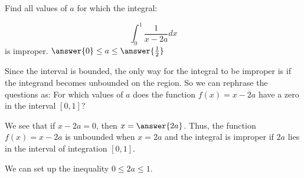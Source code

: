 \documentclass{ximera}
\author{Jim Talamo}
\begin{document}
\begin{exercise}
Find all values of $a$ for which the integral:

\[
\int_{0}^{1} \frac{1}{x-2a} dx
\]
 is improper.   $\answer{0} \leq a \leq \answer{\frac{1}{2}}$

\begin{hint}
Since the interval is bounded, the only way for the integral to be improper is if the integrand becomes unbounded on the region. So we can rephrase the questions as:
For which values of $a$ does the function $f(x) = x-2a$ have a zero in the interval $[0,1]$? 

We see that if $x-2a = 0$, then $x = \answer{2a}$.  Thus, the function $f(x) = x-2a$ is unbounded when $x=2a$ and the integral is improper if $2a$ lies in the interval of integration $[0,1]$.  

We can set up the inequality $0\leq 2a \leq 1$.  
\end{hint}

\end{exercise}
\end{document}
